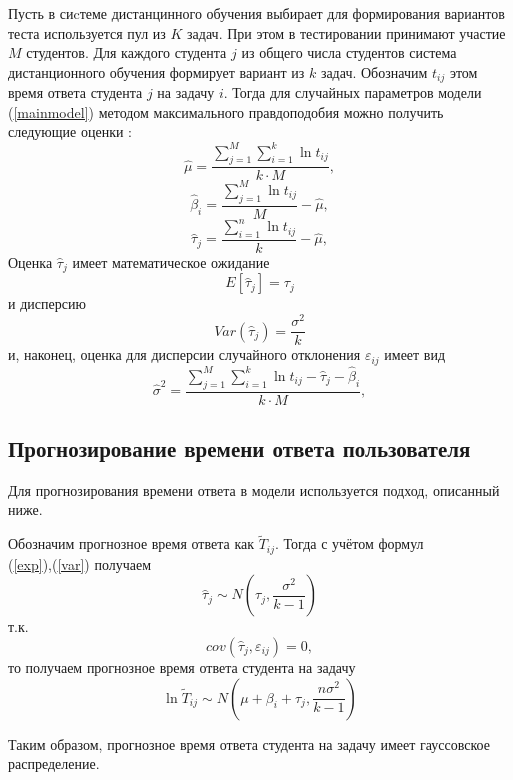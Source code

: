 Пусть в сиcтеме дистанцинного обучения выбирает для формирования вариантов теста используется пул из $K$ задач. При этом в тестировании принимают участие $M$ студентов. Для каждого студента $j$ из общего числа студентов система дистанционного обучения формирует вариант из $k$ задач. Обозначим $t_{ij}$ этом время ответа студента $j$ на задачу $i$. Тогда для случайных параметров модели (\ref{mainmodel}) методом макси\-мального правдоподобия  можно по\-лучить следующие  оценки :
\begin{equation}
\label{1166}
\hat{\mu} = \frac{\sum\limits_{j=1}^{M}\sum\limits_{i=1}^{k}\ln t_{ij}}{k \cdot M},
\end{equation}
\begin{equation}
\hat{\beta}_i = \frac{\sum\limits_{j=1}^{M}\ln t_{ij}}{M} - \hat{\mu},
\end{equation}
\begin{equation}
\hat{\tau}_j = \frac{\sum\limits_{i=1}^{n}\ln t_{ij}}{k} - \hat{\mu},
\end{equation}
Оценка $\hat{\tau}_j$ имеет математическое ожидание
\begin{equation}
\label{exp}
E[\hat{\tau}_j] = \tau_j
\end{equation}
и дисперсию
\begin{equation}
\label{var}
Var(\hat{\tau}_j) = \frac{\sigma^2}{k}
\end{equation}
и, наконец, оценка для дисперсии случайного отклонения $\varepsilon_{ij}$ имеет вид
\begin{equation}
\label{1167}
\hat{\sigma}^2 = \frac{\sum\limits_{j=1}^{M}\sum\limits_{i=1}^{k}\ln t_{ij} - \hat{\tau}_j - \hat{\beta}_i}{k \cdot M},
\end{equation}

\subsection{Прогнозирование времени ответа пользователя}
\label{PVOP}

Для прогнозирования времени ответа в модели используется подход, опи\-санный ниже.

Обозначим прогнозное время ответа как $\tilde{T}_{ij}$. Тогда с учётом формул \\(\ref{exp}),(\ref{var}) получаем
\begin{equation}
\hat{\tau}_j \sim N\left(\tau_j, \frac{\sigma^2}{k-1}\right)
\end{equation}
т.к.
\begin{equation}
cov(\hat{\tau}_j,\varepsilon_{ij}) = 0,
\end{equation}
то получаем прогнозное время ответа студента на задачу
\begin{equation}
\label{predictedtime}
\ln \tilde{T}_{ij} \sim N\left(\mu + \beta_i + \tau_j,\frac{n\sigma^2}{k-1}\right)
\end{equation}

Таким образом, прогнозное время ответа студента на задачу имеет гаус\-совское распределение.